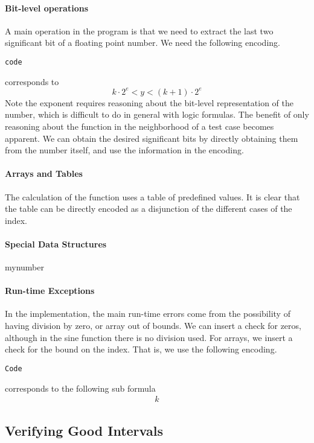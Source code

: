 \paragraph{Bit-level operations}
A main operation in the program is that we need to extract the last two significant bit of a floating point number. We need the following encoding. 
\begin{verbatim}
code
\end{verbatim}
corresponds to
\[
k\cdot 2^e< y <(k+1)\cdot 2^e
\]
Note the exponent requires reasoning about the bit-level representation of the number, which is difficult to do in general with logic formulas. The benefit of only reasoning about the function in the neighborhood of a test case becomes apparent. We can obtain the desired significant bits by directly obtaining them from the number itself, and use the information in the encoding. 

\paragraph{Arrays and Tables}

The calculation of the function uses a table of predefined values. It is clear that the table can be directly encoded as a disjunction of the different cases of the index. 

\paragraph{Special Data Structures}

mynumber

\paragraph{Run-time Exceptions}

In the implementation, the main run-time errors come from the possibility of having division by zero, or array out of bounds. We can insert a check for zeros, although in the sine function there is no division used. For arrays, we insert a check for the bound on the index. That is, we use the following encoding. 
\begin{verbatim}
Code
\end{verbatim}
corresponds to the following sub formula
\begin{eqnarray*}
k
\end{eqnarray*}


\subsection{Verifying Good Intervals}

